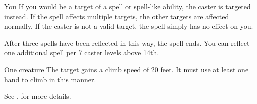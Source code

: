 \begin{spellheader}
\end{spellheader}
\begin{spelleffects}
    \begin{spelltarget}{You}
        \spelleffect If you would be a target of a spell or spell-like ability, the caster is targeted instead. If the spell affects multiple targets, the other targets are affected normally. If the caster is not a valid target, the spell simply has no effect on you.

        After three spells have been reflected in this way, the spell ends. You can reflect one additional spell per 7 caster levels above 14th.
    \end{spelltarget}
\end{spelleffects}
\begin{spellfooter}
    
\end{spellfooter}

\begin{spellheader}
    \spelldur{\durmed}
\end{spellheader}
\begin{spelleffects}
    \begin{spelltarget}{One creature}
        \spelleffect The target gains a climb speed of 20 feet. It must use at least one hand to climb in this manner.
    \end{spelltarget}
\end{spelleffects}
\begin{spellfooter}
    \spellnotes See , for more details.

\end{spellfooter}%

